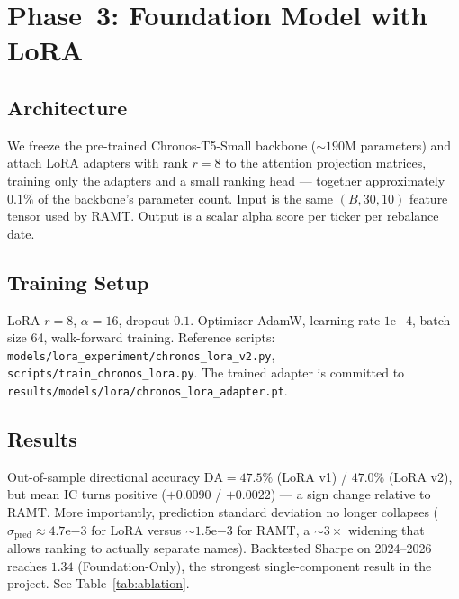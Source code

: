 \documentclass[conference]{IEEEtran}
\begin{document}
\section{Phase~3: Foundation Model with LoRA}
\subsection{Architecture}
We freeze the pre-trained Chronos-T5-Small backbone (${\sim}190\mathrm{M}$
parameters) and attach LoRA adapters with rank $r{=}8$ to the attention
projection matrices, training only the adapters and a small ranking head ---
together approximately $0.1\%$ of the backbone's parameter count. Input is the
same $(B, 30, 10)$ feature tensor used by RAMT. Output is a scalar alpha score
per ticker per rebalance date.

\subsection{Training Setup}
LoRA $r{=}8$, $\alpha{=}16$, dropout $0.1$. Optimizer AdamW, learning rate
$1\mathrm{e}{-4}$, batch size 64, walk-forward training. Reference scripts:
\texttt{models/lora\_experiment/chronos\_lora\_v2.py},
\texttt{scripts/train\_chronos\_lora.py}. The trained adapter is committed to
\texttt{results/models/lora/chronos\_lora\_adapter.pt}.

\subsection{Results}
Out-of-sample directional accuracy $\mathrm{DA}=47.5\%$ (LoRA v1) /
$47.0\%$ (LoRA v2), but mean IC turns positive
($+0.0090$ / $+0.0022$) --- a sign change relative to RAMT. More importantly,
prediction standard deviation no longer collapses
($\sigma_{\mathrm{pred}} \approx 4.7\mathrm{e}{-3}$ for LoRA versus
${\sim}1.5\mathrm{e}{-3}$ for RAMT, a ${\sim}3\times$ widening that allows
ranking to actually separate names). Backtested Sharpe on 2024--2026 reaches
$1.34$ (Foundation-Only), the strongest single-component result in the
project. See Table~\ref{tab:ablation}.

\end{document}
